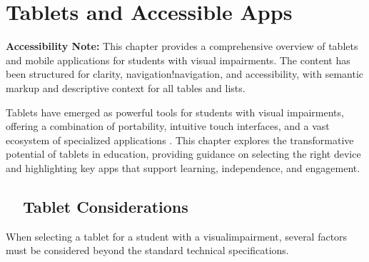 \chapter{Tablets and Accessible Apps}\label{ch2:tablets}

\begin{raggedright}
	\textbf{Accessibility Note:} This chapter provides a comprehensive overview of tablets and mobile applications for students with visual impairments. The content has been structured for clarity, navigation!navigation, and accessibility, with semantic markup and descriptive context for all tables and lists.
\end{raggedright}

Tablets have emerged as powerful tools for students with visual impairments, offering a combination of portability, intuitive touch interfaces, and a vast ecosystem of specialized applications \supercite{Day2021, Kelly2011}. This chapter explores the transformative potential of tablets in education, providing guidance on selecting the right device and highlighting key apps that support learning, independence, and engagement.

\section{~~Tablet Considerations}\label{ch2:sec:tablet-considerations}

When selecting a \gls{tablet} for a student with a \gls{visualimpairment}, several factors must be considered beyond the standard technical specifications.

